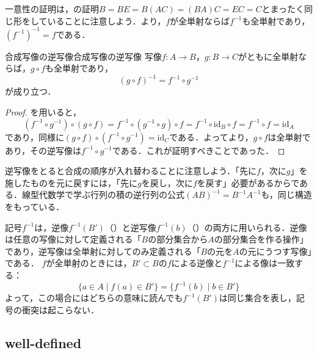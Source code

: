 一意性の証明は，の証明$B = BE = B(AC) = (BA)C = EC = C$とまったく同じ形をしていることに注意しよう．より，$f$が全単射ならば$f^{-1}$も全単射であり，$(f^{-1})^{-1} = f$である．

\begin{cor}{合成写像の逆写像}{合成写像の逆写像}
  写像$f \colon A \to B$，$g \colon B \to C$がともに全単射ならば，$g \circ f$も全単射であり，
  \[
    (g \circ f)^{-1} = f^{-1} \circ g^{-1}
  \]
  が成り立つ．
\end{cor}

\begin{tleftbar}
  \begin{proof}
    を用いると，
    \[
      (f^{-1} \circ g^{-1}) \circ (g \circ f)
      = f^{-1} \circ (g^{-1} \circ g) \circ f
      = f^{-1} \circ \mathrm{id}_B \circ f
      = f^{-1} \circ f
      = \mathrm{id}_A
    \]
    であり，同様に$(g \circ f) \circ (f^{-1} \circ g^{-1}) = \mathrm{id}_C$である．よってより，$g \circ f$は全単射であり，その逆写像は$f^{-1} \circ g^{-1}$である．これが証明すべきことであった．
  \end{proof}
\end{tleftbar}

逆写像をとると合成の順序が入れ替わることに注意しよう．「先に$f$，次に$g$」を施したものを元に戻すには，「先に$g$を戻し，次に$f$を戻す」必要があるからである．線型代数学で学ぶ行列の積の逆行列の公式$(AB)^{-1} = B^{-1} A^{-1}$も，同じ構造をもっている．

\begin{remark}[記号$f^{-1}$のふたつの意味]
  記号$f^{-1}$は，逆像$f^{-1}(B')$（）と逆写像$f^{-1}(b)$（）の両方に用いられる．逆像は任意の写像に対して定義される「$B$の部分集合から$A$の部分集合を作る操作」であり，逆写像は全単射に対してのみ定義される「$B$の元を$A$の元にうつす写像」である．
  $f$が全単射のときには，$B' \subset B$の$f$による逆像と$f^{-1}$による像は一致する：
  \[
    \{ a \in A \mid f(a) \in B' \} = \{ f^{-1}(b) \mid b \in B' \}
  \]
  よって，この場合にはどちらの意味に読んでも$f^{-1}(B')$は同じ集合を表し，記号の衝突は起こらない．
\end{remark}

\subsection{well-defined}
\label{subsec:well-defined}

